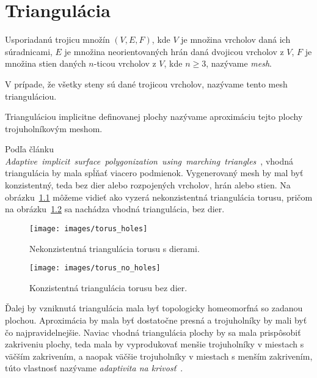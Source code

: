 \chapter{Triangulácia}
\label{kap:triangulation}

Usporiadanú trojicu množín $(V, E, F)$, kde $V$ je množina vrcholov daná ich súradnicami, 
$E$ je množina neorientovaných hrán daná 
dvojicou vrcholov z $V$, $F$ je množina stien daných $n$-ticou vrcholov z $V$, kde $n \geq 3$, 
nazývame \textit{mesh}.

V prípade, že všetky steny sú dané trojicou vrcholov, nazývame tento mesh trianguláciou.

Trianguláciou implicitne definovanej plochy nazývame aproximáciu tejto plochy trojuholníkovým meshom.

Podľa článku \mbox{\textit{Adaptive implicit surface polygonization using marching triangles}~\cite{akkouche2001adaptive}},
vhodná triangulácia by mala spĺňať viacero podmienok. Vygenerovaný mesh by mal byť konzistentný, 
teda bez dier alebo rozpojených vrcholov, hrán alebo stien. Na \mbox{obrázku \ref{obr:torus_holes}}
môžeme vidieť ako vyzerá nekonzistentná triangulácia torusu, pričom na 
\mbox{obrázku \ref{obr:torus_no_holes}} sa nachádza vhodná triangulácia, bez dier. 

\begin{figure}
    \centerline{\texttt{[image: images/torus\_holes]}}
    \caption[Príklad nekonzistentnej triangulácie]{Nekonzistentná triangulácia torusu s dierami.}
    \label{obr:torus_holes}
\end{figure}

\begin{figure}
    \centerline{\texttt{[image: images/torus\_no\_holes]}}
    \caption[Príklad konzistentnej triangulácie]{Konzistentná triangulácia torusu bez dier.}
    \label{obr:torus_no_holes}
\end{figure}

Ďalej by vzniknutá triangulácia mala byť topologicky homeomorfná 
so zadanou plochou. Aproximácia by mala byť dostatočne presná a trojuholníky by mali 
byť čo najpravidelnejšie. Naviac vhodná triangulácia plochy by sa mala prispôsobiť zakriveniu plochy,
teda mala by vyprodukovať menšie trojuholníky v miestach s väčším zakrivením, a naopak väčšie
trojuholníky v miestach s menším zakrivením, túto vlastnosť nazývame \textit{adaptivita na krivosť}~\cite{akkouche2001adaptive}.

